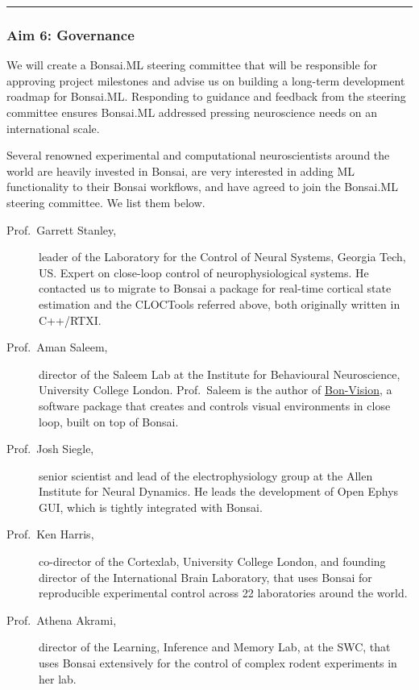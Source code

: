 \noindent\rule{\textwidth}{1pt}
\subsubsection{Aim 6: Governance}

We will create a Bonsai.ML steering committee that will be responsible for
approving project milestones and advise us on building a long-term development
roadmap for Bonsai.ML.
%
Responding to guidance and feedback from the steering committee ensures
Bonsai.ML addressed pressing neuroscience needs on an international scale.

Several renowned experimental and computational neuroscientists around the
world are heavily invested in Bonsai, are very interested in adding ML
functionality to their Bonsai workflows, and have agreed to join the Bonsai.ML
steering committee. We list them below.

\begin{description}

    \item[Prof.~Garrett Stanley,] leader of the Laboratory for the Control of
        Neural Systems, Georgia Tech, US. Expert on close-loop control of
        neurophysiological systems. He contacted us to migrate to Bonsai
        a package for real-time cortical state estimation and the CLOCTools
        referred above, both originally written in C++/RTXI.

    \item[Prof.~Aman Saleem,] director of the Saleem Lab at the Institute for
        Behavioural Neuroscience, University College London. Prof.~Saleem is the
        author of \href{https://bonvision.github.io/}{Bon-Vision}, a software
        package that creates and controls visual environments in close loop,
        built on top of Bonsai.

    \item[Prof.~Josh Siegle,] senior scientist and lead of the
        electrophysiology group at the Allen Institute for Neural Dynamics. He
        leads the development of Open Ephys GUI, which is tightly integrated
        with Bonsai.

    \item[Prof.~Ken Harris,] co-director of the Cortexlab, University College
        London, and founding director of the International Brain Laboratory,
        that uses Bonsai for reproducible experimental control across 22
        laboratories around the world.

    \item[Prof.~Athena Akrami,] director of the Learning, Inference and Memory
        Lab, at the SWC, that uses Bonsai extensively for the control of
        complex rodent experiments in her lab.

\end{description}

